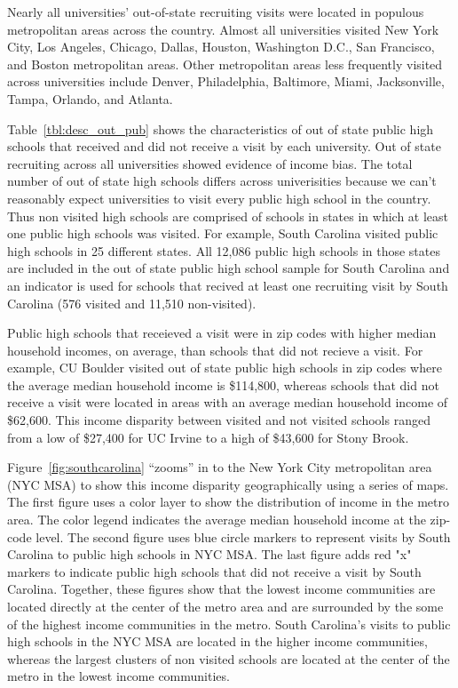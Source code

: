 \documentclass[twoside]{article}
\begin{document}
Nearly all universities' out-of-state recruiting visits were located in populous metropolitan areas across the country. Almost all universities visited New York City, Los Angeles, Chicago, Dallas, Houston, Washington D.C., San Francisco, and Boston metropolitan areas. Other metropolitan areas less frequently visited across universities include Denver, Philadelphia, Baltimore, Miami, Jacksonville, Tampa, Orlando, and Atlanta.

Table~\ref{tbl:desc_out_pub} shows the characteristics of out of state public high schools that received and did not receive a visit by each university. Out of state recruiting across all universities showed evidence of income bias. The total number of out of state high schools differs across univerisities because we can't reasonably expect universities to visit every public high school in the country. Thus non visited high schools are comprised of schools in states in which at least one public high schools was visited. For example, South Carolina visited public high schools in 25 different states. All 12,086 public high schools in those states are included in the out of state public high school sample for South Carolina and an indicator is used for schools that recived at least one recruiting visit by South Carolina (576 visited and 11,510 non-visited).

Public high schools that receieved a visit were in zip codes with higher median household incomes, on average, than schools that did not recieve a visit. For example, CU Boulder visited out of state public high schools in zip codes where the average median household income is \$114,800, whereas schools that did not receive a visit were located in areas with an average median household income of \$62,600. This income disparity between visited and not visited schools ranged from a low of \$27,400 for UC Irvine to a high of \$43,600 for Stony Brook. %

Figure~\ref{fig:southcarolina} “zooms” in to the New York City metropolitan area (NYC MSA) to show this income disparity geographically using a series of maps. The first figure uses a color layer to show the distribution of income in the metro area. The color legend indicates the average median household income at the zip-code level. The second figure uses blue circle markers to represent visits by South Carolina to public high schools in NYC MSA. The last figure adds red "x" markers to indicate public high schools that did not receive a visit by South Carolina. Together, these figures show that the lowest income communities are located directly at the center of the metro area and are surrounded by the some of the highest income communities in the metro. South Carolina's visits to public high schools in the NYC MSA are located in the higher income communities, whereas the largest clusters of non visited schools are located at the center of the metro in the lowest income communities.
\end{document}
